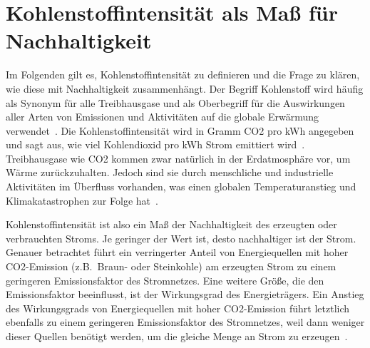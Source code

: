 \section{Kohlenstoffintensität als Maß für Nachhaltigkeit}
Im Folgenden gilt es, Kohlenstoffintensität zu definieren und die Frage zu klären, wie diese mit Nachhaltigkeit zusammenhängt.
Der Begriff Kohlenstoff wird häufig als Synonym für alle Treibhausgase und als Oberbegriff für die Auswirkungen aller Arten von Emissionen und Aktivitäten auf die globale Erwärmung verwendet~\cite{GreenSoftwareFoundation.2022}.
Die Kohlenstoffintensität wird in Gramm \ac{CO2} pro \ac{kWh} angegeben und sagt aus, wie viel Kohlendioxid pro \ac{kWh} Strom emittiert wird~\cite{LyndonRuff.20220420T15:34:17.000Z}.
Treibhausgase wie \ac{CO2} kommen zwar natürlich in der Erdatmosphäre vor, um Wärme zurückzuhalten.
Jedoch sind sie durch menschliche und industrielle Aktivitäten im Überfluss vorhanden, was einen globalen Temperaturanstieg und Klimakatastrophen zur Folge hat~\cite{Currie.2024}.

Kohlenstoffintensität ist also ein Maß der Nachhaltigkeit des erzeugten oder verbrauchten Stroms.
Je geringer der Wert ist, desto nachhaltiger ist der Strom.
Genauer betrachtet führt ein verringerter Anteil von Energiequellen mit hoher \ac{CO2}-Emission (z.B.\ Braun- oder Steinkohle) am erzeugten Strom zu einem geringeren Emissionsfaktor des Stromnetzes.
Eine weitere Größe, die den Emissionsfaktor beeinflusst, ist der Wirkungsgrad des Energieträgers.
Ein Anstieg des Wirkungsgrads von Energiequellen mit hoher \ac{CO2}-Emission führt letztlich ebenfalls zu einem geringeren Emissionsfaktor des Stromnetzes, weil dann weniger dieser Quellen benötigt werden, um die gleiche Menge an Strom zu erzeugen~\cite{Icha.2020}.

